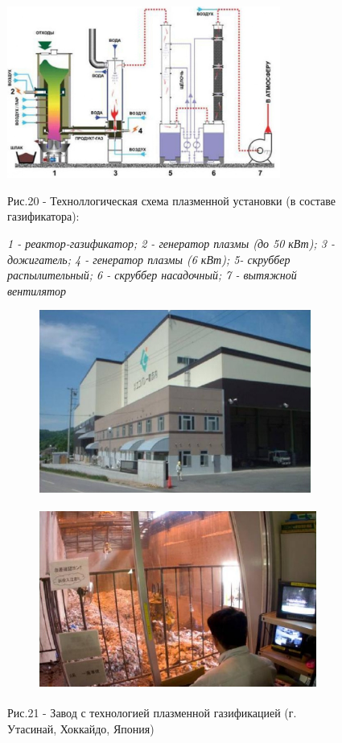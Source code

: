 \begin{figure}[H]
	\centering
	\includegraphics[width=0.8\textwidth]{media/chem2/image84}
	\caption*{Рис.20 - Техноллогическая схема плазменной установки (в составе газификатора):}
	\caption*{\normalfont\emph{1 - реактор-газификатор; 2 - генератор плазмы (до 50 кВт); 3 -
дожигатель; 4 - генератор плазмы (6 кВт); 5- скруббер распылительный; 6 - скруббер
насадочный; 7 - вытяжной вентилятор}}
\end{figure}

\begin{figure}[H]
    \centering
    \begin{subfigure}[t]{0.45\textwidth}
        \centering
        \includegraphics[width=\textwidth, height=6cm]{media/chem2/image85}
    \end{subfigure}
    \begin{subfigure}[t]{0.45\textwidth}
        \centering
        \includegraphics[width=\textwidth, height=6cm]{media/chem2/image86}
    \end{subfigure}
    \caption*{Рис.21 - Завод с технологией плазменной газификацией (г. Утасинай, Хоккайдо, Япония)}
\end{figure}

